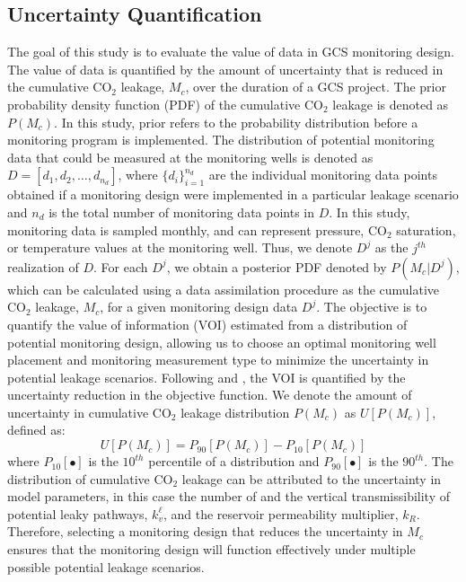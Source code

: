 \documentclass[a4paper,fleqn]{cas-sc}
\begin{document}
\subsection{Uncertainty Quantification}
The goal of this study is to evaluate the value of data in GCS monitoring design. The value of data is quantified by the amount of uncertainty that is reduced in the cumulative CO$_2$ leakage, $M_c$, over the duration of a GCS project. The prior probability density function (PDF) of the cumulative CO$_2$ leakage is denoted as $P(M_c)$. In this study, prior refers to the probability distribution before a monitoring program is implemented. The distribution of potential monitoring data that could be measured at the monitoring wells is denoted as $D=[d_1,d_2,\ldots,d_{n_d}]$, where $\{d_i\}_{i=1}^{n_d}$ are the individual monitoring data points obtained if a monitoring design were implemented in a particular leakage scenario and $n_d$ is the total number of monitoring data points in $D$. In this study, monitoring data is sampled monthly, and can represent pressure, CO$_2$ saturation, or temperature values at the monitoring well. Thus, we denote $D^j$ as the $j^{th}$ realization of $D$. For each $D^j$, we obtain a posterior PDF denoted by $P(M_c \vert D^j)$, which can be calculated using a data assimilation procedure as the cumulative CO$_2$ leakage, $M_c$, for a given monitoring design data $D^j$. The objective is to quantify the value of information (VOI) estimated from a distribution of potential monitoring design, allowing us to choose an optimal monitoring well placement and monitoring measurement type to minimize the uncertainty in potential leakage scenarios.
Following \citet{Chen2017328, Chen2018} and \citet{Le2014505}, the VOI is quantified by the uncertainty reduction in the objective function. We denote the amount of uncertainty in cumulative CO$_2$ leakage distribution $P(M_c)$ as $U[P(M_c)]$, defined as:
\begin{equation} \label{eq:1}
    U[P(M_c)] = P_{90}[P(M_c)] - P_{10}[P(M_c)]
\end{equation}
where $P_{10}[\bullet]$ is the $10^{th}$ percentile of a distribution and $P_{90}[\bullet]$ is the $90^{th}$. The distribution of cumulative CO$_2$ leakage can be attributed to the uncertainty in model parameters, in this case the number of and the vertical transmissibility of potential leaky pathways, $k_v^\ell$, and the reservoir permeability multiplier, $k_R$. Therefore, selecting a monitoring design that reduces the uncertainty in $M_c$ ensures that the monitoring design will function effectively under multiple possible potential leakage scenarios.
\end{document}
